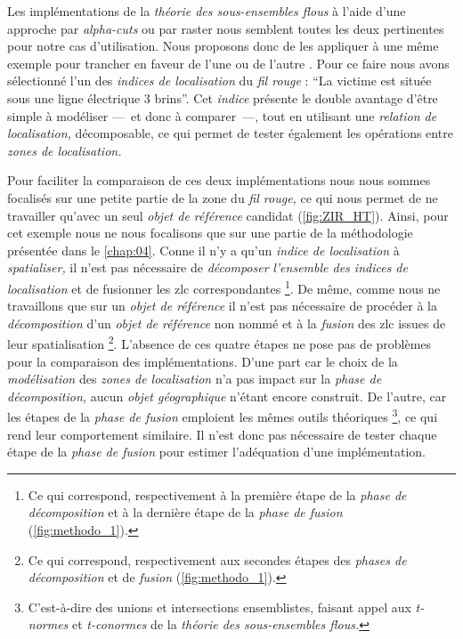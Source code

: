 Les implémentations de la \emph{théorie des sous-ensembles flous} à
l'aide d'une approche par \emph{alpha-cuts} ou par raster nous
semblent toutes les deux pertinentes pour notre cas
d'utilisation. Nous proposons donc de les appliquer à une même exemple
pour trancher en faveur de l'une ou de l'autre
\autocite{Bunel2019a}. Pour ce faire nous avons sélectionné l'un des
\emph{indices de localisation} du \emph{fil rouge} : \enquote{La
  victime est située sous une ligne électrique 3 brins}. Cet
\emph{indice} présente le double avantage d'être simple à modéliser
---~et donc à comparer~---, tout en utilisant une \emph{relation de
  localisation,} décomposable, ce qui permet de tester également les
opérations entre \emph{zones de localisation.}

Pour faciliter la comparaison de ces deux implémentations nous nous
sommes focalisés sur une petite partie de la zone du \emph{fil rouge,}
ce qui nous permet de ne travailler qu'avec un seul \emph{objet de
  référence} candidat (\autoref{fig:ZIR_HT}). Ainsi, pour cet exemple
nous ne nous focalisons que sur une partie de la méthodologie
présentée dans le \autoref{chap:04}. Conne il n'y a qu'un \emph{indice
  de localisation} à \emph{spatialiser,} il n'est pas nécessaire de
\emph{décomposer} \emph{l'ensemble des indices de localisation} et de
fusionner les zlc correspondantes \footnote{Ce qui
  correspond, respectivement à la première étape de la \emph{phase de
    décomposition} et à la dernière étape de la \emph{phase de fusion}
  (\autoref{fig:methodo_1}).}. De même, comme nous ne travaillons que
sur un \emph{objet de référence} il n'est pas nécessaire de procéder à
la \emph{décomposition} d'un \emph{objet de référence} non nommé et à
la \emph{fusion} des zlc issues de leur spatialisation
\footnote{Ce qui correspond, respectivement aux secondes étapes des
  \emph{phases de décomposition} et de \emph{fusion}
  (\autoref{fig:methodo_1}).}. L'absence de ces quatre étapes ne pose
pas de problèmes pour la comparaison des implémentations. D'une part
car le choix de la \emph{modélisation} des \emph{zones de
  localisation} n'a pas impact sur la \emph{phase de décomposition,}
aucun \emph{objet géographique} n'étant encore construit. De l'autre,
car les étapes de la \emph{phase de fusion} emploient les mêmes outils
théoriques \footnote{C'est-à-dire des unions et intersections
  ensemblistes, faisant appel aux \emph{t-normes} et \emph{t-conormes}
  de la \emph{théorie des sous-ensembles flous.}}, ce qui rend leur
comportement similaire. Il n'est donc pas nécessaire de tester chaque
étape de la \emph{phase de fusion} pour estimer l'adéquation d'une
implémentation.

